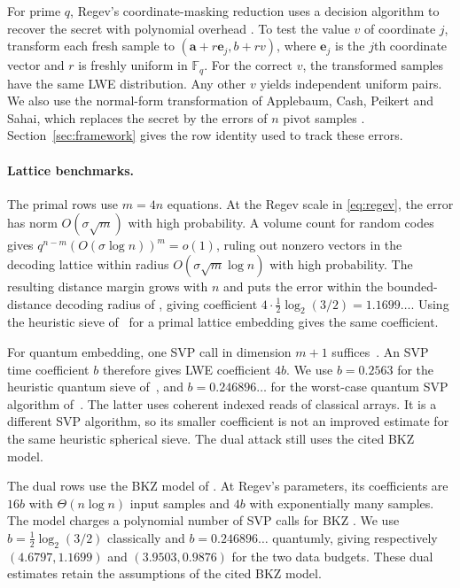 \documentclass[runningheads,envcountsame,envcountsect,orivec]{llncs}
\begin{document}
For prime $q$, Regev's coordinate-masking reduction
uses a decision algorithm to recover the secret with polynomial overhead
\cite[Lemma~4.2]{Regev09}. To test the value $v$ of
coordinate $j$, transform each fresh sample to
$(\boldsymbol a+r\boldsymbol e_j,b+rv)$, where
$\boldsymbol e_j$ is the $j$th coordinate vector and $r$
is freshly uniform in $\mathbb F_q$. For the correct $v$, the transformed samples have the same
LWE distribution. Any other $v$ yields independent
uniform pairs. We also use the normal-form transformation
of Applebaum, Cash, Peikert and Sahai, which replaces the
secret by the errors of $n$ pivot samples
\cite[Lemma~2]{ACPS09}. Section~\ref{sec:framework}
gives the row identity used to track these errors.

\paragraph{Lattice benchmarks.}
\label{sec:lattice-benchmarks}
The primal rows use $m=4n$ equations. At the Regev scale in
\eqref{eq:regev}, the error has norm $O(\sigma\sqrt m)$ with
high probability. A volume count for random codes gives
$q^{n-m}(O(\sigma\log n))^m=o(1)$, ruling out nonzero vectors in the
decoding lattice within radius $O(\sigma\sqrt m\log n)$ with high probability.
The resulting distance margin grows with $n$ and puts the
error within the bounded-distance decoding radius of
\cite[Corollary~1.12]{HKKL26}, giving coefficient
$4\cdot\tfrac12\log_2(3/2)=1.1699\ldots$.
Using the heuristic sieve of~\cite{BDGL16} for a primal
lattice embedding gives the same coefficient.

For quantum embedding, one SVP call in dimension $m+1$
suffices~\cite[Section~5]{HKM18}. An SVP time coefficient $b$
therefore gives LWE coefficient $4b$.
We use $b=0.2563$ for the heuristic quantum sieve
of~\cite{BCSS23}, and $b=0.246896\ldots$ for the worst-case
quantum SVP algorithm of~\cite[Theorem~11.1]{HKKL26}.
The latter uses coherent indexed reads of classical arrays.
It is a different SVP algorithm, so its smaller coefficient is not
an improved estimate for the same heuristic spherical sieve.
The dual attack still uses the cited BKZ model.

The dual rows use the BKZ model of
\cite[Theorem~9 and Table~1]{HKM18}. At Regev's parameters,
its coefficients are $16b$ with $\Theta(n\log n)$ input samples
and $4b$ with exponentially many samples.
The model charges a polynomial number of SVP calls for BKZ
\cite[Section~2]{HKM18}. We use
$b=\tfrac12\log_2(3/2)$ classically and
$b=0.246896\ldots$ quantumly, giving respectively
$(4.6797,1.1699)$ and $(3.9503,0.9876)$ for the two data budgets.
These dual estimates retain the assumptions of the cited BKZ model.
\end{document}
